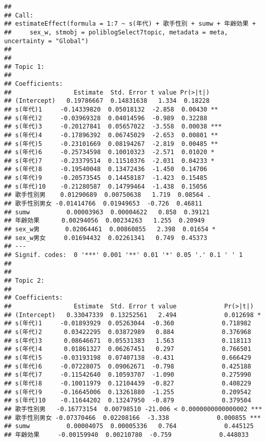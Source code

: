\documentclass[
]{article}
\begin{document}
\begin{verbatim}
## 
## Call:
## estimateEffect(formula = 1:7 ~ s(年代) + 歌手性別 + sumw + 年齢効果 + 
##     sex_w, stmobj = poliblogSelect7topic, metadata = meta, uncertainty = "Global")
## 
## 
## Topic 1:
## 
## Coefficients:
##                 Estimate  Std. Error t value Pr(>|t|)    
## (Intercept)   0.19786667  0.14831638   1.334  0.18228    
## s(年代)1     -0.14339820  0.05018132  -2.858  0.00430 ** 
## s(年代)2     -0.03969328  0.04014596  -0.989  0.32288    
## s(年代)3     -0.20127841  0.05657022  -3.558  0.00038 ***
## s(年代)4     -0.17896392  0.06745029  -2.653  0.00801 ** 
## s(年代)5     -0.23101669  0.08194267  -2.819  0.00485 ** 
## s(年代)6     -0.25734598  0.10010323  -2.571  0.01020 *  
## s(年代)7     -0.23379514  0.11510376  -2.031  0.04233 *  
## s(年代)8     -0.19540048  0.13472436  -1.450  0.14706    
## s(年代)9     -0.20573545  0.14458187  -1.423  0.15485    
## s(年代)10    -0.21280587  0.14799464  -1.438  0.15056    
## 歌手性別男    0.01290689  0.00750638   1.719  0.08564 .  
## 歌手性別男女 -0.01414766  0.01949653  -0.726  0.46811    
## sumw          0.00003963  0.00004622   0.858  0.39121    
## 年齢効果      0.00294056  0.00234263   1.255  0.20949    
## sex_w男       0.02064461  0.00860855   2.398  0.01654 *  
## sex_w男女     0.01694432  0.02261341   0.749  0.45373    
## ---
## Signif. codes:  0 '***' 0.001 '**' 0.01 '*' 0.05 '.' 0.1 ' ' 1
## 
## 
## Topic 2:
## 
## Coefficients:
##                 Estimate  Std. Error t value             Pr(>|t|)    
## (Intercept)   0.33047339  0.13252561   2.494             0.012698 *  
## s(年代)1     -0.01893929  0.05263044  -0.360             0.718982    
## s(年代)2      0.03422295  0.03872989   0.884             0.376968    
## s(年代)3      0.08646671  0.05531383   1.563             0.118113    
## s(年代)4      0.01861327  0.06267451   0.297             0.766501    
## s(年代)5     -0.03193198  0.07407138  -0.431             0.666429    
## s(年代)6     -0.07228075  0.09062671  -0.798             0.425188    
## s(年代)7     -0.11542640  0.10593707  -1.090             0.275990    
## s(年代)8     -0.10011979  0.12104439  -0.827             0.408229    
## s(年代)9     -0.16645006  0.13261880  -1.255             0.209542    
## s(年代)10    -0.11644202  0.13247950  -0.879             0.379504    
## 歌手性別男   -0.16773154  0.00798510 -21.006 < 0.0000000000000002 ***
## 歌手性別男女 -0.07370466  0.02208166  -3.338             0.000855 ***
## sumw          0.00004075  0.00005336   0.764             0.445125    
## 年齢効果     -0.00159940  0.00210780  -0.759             0.448033    

\end{verbatim}
\end{document}
